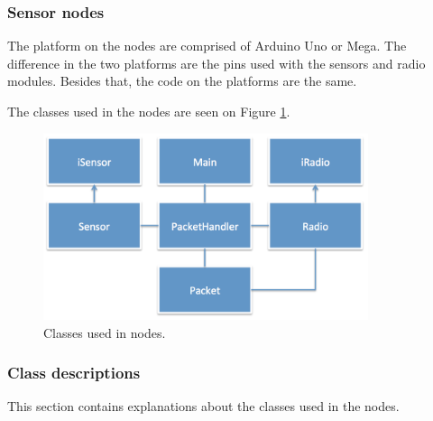 \subsubsection*{Sensor nodes}
The platform on the nodes are comprised of Arduino Uno or Mega. The difference in the two platforms are the pins used with the sensors and radio modules. Besides that, the code on the platforms are the same.

The classes used in the nodes are seen on Figure \ref{fig:nodeClass}.
\begin{figure}[h!]
\centering
\includegraphics[width=0.85\textwidth]{chapters/implementation/figures/nodeClass.png}
\caption{Classes used in nodes.}
\label{fig:nodeClass}
\end{figure}


\subsubsection*{Class descriptions}
This section contains explanations about the classes used in the nodes.

